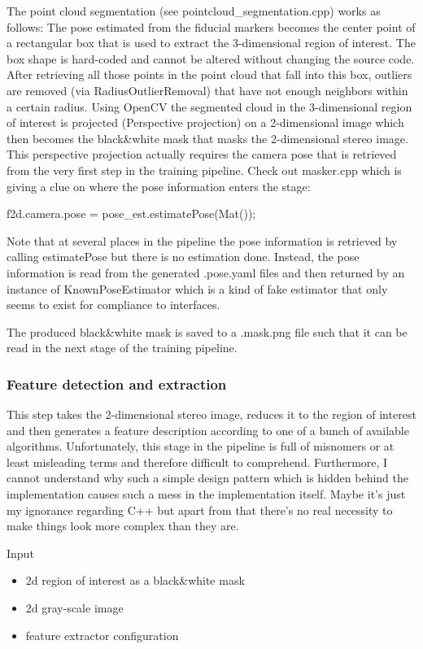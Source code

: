 The point cloud segmentation (see pointcloud\_segmentation.cpp) works as
follows: The pose estimated from the fiducial markers becomes the center point
of a rectangular box that is used to extract the 3-dimensional region of
interest. The box shape is hard-coded and cannot be altered without changing
the source code. After retrieving all those points in the point cloud that fall
into this box, outliers are removed (via RadiusOutlierRemoval) that have not
enough neighbors within a certain radius. Using OpenCV the segmented cloud in
the 3-dimensional region of interest is projected (Perspective projection) on a
2-dimensional image which then becomes the black\&white mask that masks the
2-dimensional stereo image. This perspective projection actually requires the
camera pose that is retrieved from the very first step in the training
pipeline. Check out masker.cpp which is giving a clue on where the pose
information enters the stage:

       f2d.camera.pose = pose\_est.estimatePose(Mat());

Note that at several places in the pipeline the pose information is retrieved
by calling estimatePose but there is no estimation done. Instead, the pose
information is read from the generated .pose.yaml files and then returned by an
instance of KnownPoseEstimator which is a kind of fake estimator that only
seems to exist for compliance to interfaces.

The produced black\&white mask is saved to a .mask.png file such that it can be
read in the next stage of the training pipeline.


\subsubsection*{Feature detection and extraction}

This step takes the 2-dimensional stereo image, reduces it to the region of
interest and then generates a feature description according to one of a bunch
of available algorithms. Unfortunately, this stage in the pipeline is full of
misnomers or at least misleading terms and therefore difficult to comprehend.
Furthermore, I cannot understand why such a simple design pattern which is
hidden behind the implementation causes such a mess in the implementation
itself. Maybe it's just my ignorance regarding C++ but apart from that there's
no real necessity to make things look more complex than they are.

Input
\begin{itemize}
    \item 2d region of interest as a black\&white mask
    \item 2d gray-scale image
    \item feature extractor configuration
\end{itemize}

